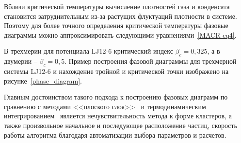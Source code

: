 \begin{table}[h!]
  \caption{Значения тройных и критических точек, а также коэффициентов фитирования $A$ и $a$ из уравнений \eqref{MACR-eq4} для двумерных и трехмерных систем Леннарда-Джонса, рассматриваемых в данной работе.}
  \label{PRIMe-Table2}
\end{table}



Вблизи критической температуры вычисление плотностей газа и конденсата становится затруднительным из-за растущих флуктуаций плотности в системе.
Поэтому для более точного определения критической температуры фазовые диаграммы можно аппроксимировать следующими уравнениями~\ref{MACR-eq4}.

В трехмерии для потенциала LJ12-6 критический индекс $\beta_c = 0{,}325$, а в двумерии -- $\beta_c = 0{,}5$.
Пример построения фазовой диаграммы для трехмерной системы LJ12-6 и нахождение тройной и критической точки изображено на рисунке~\ref{phase_diagram}.

Главным достоинством такого подхода к построению фазовых диаграмм по сравнению с методами <<плоского слоя>>~\cite{10.1021/jp806127j, 10.1021/jp1117213} и термодинамическим интегрированием~\cite{10.1088/0953-8984/21/46/465104} является нечувствительность метода к форме кластеров, а также произвольное начальное и последующее расположение частиц, скорость работы алгоритма благодаря автоматизации выбора параметров и расчетов.



